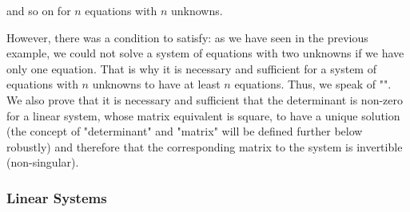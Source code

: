 	and so on for $n$ equations with $n$ unknowns.

	However, there was a condition to satisfy: as we have seen in the previous example, we could not solve a system of equations with two unknowns if we have only one equation. That is why it is necessary and sufficient for a system of equations with $n$ unknowns to have at least $n$ equations. Thus, we speak of "". We also prove that it is necessary and sufficient that the determinant is non-zero for a linear system, whose matrix equivalent is square, to have a unique solution (the concept of "determinant" and "matrix" will be defined further below robustly) and therefore that the corresponding matrix to the system is invertible (non-singular).

\pagebreak
\subsubsection{Linear Systems}

